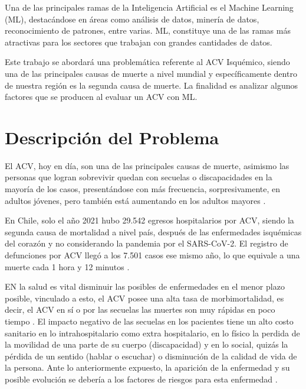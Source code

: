 \par Una de las principales ramas de la Inteligencia Artificial es el Machine Learning (ML), destacándose en áreas como análisis de datos, minería de datos, reconocimiento de patrones, entre varias. ML, constituye una de las ramas más atractivas para los sectores que trabajan con grandes cantidades de datos.\\
\par Este trabajo se abordará una problemática referente al ACV Isquémico,  siendo una de las principales causas de muerte a nivel mundial y específicamente dentro de nuestra región es la segunda causa de muerte. La finalidad es analizar algunos factores que se producen al evaluar un ACV con ML.\\


\doublespacing
\section{Descripción del Problema}
El ACV, hoy en día, son una de las principales causas de muerte, asimismo las personas que logran sobrevivir quedan con secuelas o discapacidades en la mayoría de los casos, presentándose con más frecuencia, sorpresivamente, en adultos jóvenes, pero también está aumentando en los adultos mayores \cite{Ortiz-Galeano2020}. \\
\par En Chile, solo el año 2021 hubo 29.542 egresos hospitalarios por ACV, siendo la segunda causa de mortalidad a nivel país, después de las enfermedades isquémicas del corazón y no considerando la pandemia por el SARS-CoV-2. El registro de defunciones por ACV llegó a los 7.501 casos ese mismo año, lo que equivale a una muerte cada 1 hora y 12 minutos \cite{Minsal2022}.\\
\par EN la salud es vital disminuir las posibles de enfermedades en el menor plazo posible, vinculado a esto, el ACV posee una alta tasa de morbimortalidad, es decir, el ACV en sí o por las secuelas las muertes son muy rápidas en poco tiempo \cite{Gaudiano2019}. El impacto negativo de las secuelas en los pacientes tiene un alto costo sanitario en lo intrahospitalario como extra hospitalario, en lo físico la perdida de la movilidad de una parte de su cuerpo (discapacidad) y en lo social, quizás la pérdida de un sentido (hablar o escuchar) o disminución de la calidad de vida de la persona. Ante lo anteriormente expuesto, la aparición de la enfermedad y su posible evolución se debería a los factores de riesgos para esta enfermedad \cite{Cabrera2020}.\\
